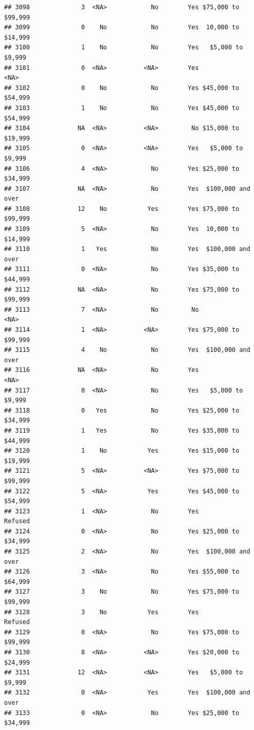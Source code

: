\documentclass[man]{apa6}
\begin{document}
\begin{verbatim}
## 3098              3  <NA>            No        Yes $75,000 to $99,999
## 3099              0    No            No        Yes  10,000 to $14,999
## 3100              1    No            No        Yes   $5,000 to $9,999
## 3101              0  <NA>          <NA>        Yes               <NA>
## 3102              0    No            No        Yes $45,000 to $54,999
## 3103              1    No            No        Yes $45,000 to $54,999
## 3104             NA  <NA>          <NA>         No $15,000 to $19,999
## 3105              0  <NA>          <NA>        Yes   $5,000 to $9,999
## 3106              4  <NA>            No        Yes $25,000 to $34,999
## 3107             NA  <NA>            No        Yes  $100,000 and over
## 3108             12    No           Yes        Yes $75,000 to $99,999
## 3109              5  <NA>            No        Yes  10,000 to $14,999
## 3110              1   Yes            No        Yes  $100,000 and over
## 3111              0  <NA>            No        Yes $35,000 to $44,999
## 3112             NA  <NA>            No        Yes $75,000 to $99,999
## 3113              7  <NA>            No         No               <NA>
## 3114              1  <NA>          <NA>        Yes $75,000 to $99,999
## 3115              4    No            No        Yes  $100,000 and over
## 3116             NA  <NA>            No        Yes               <NA>
## 3117              0  <NA>            No        Yes   $5,000 to $9,999
## 3118              0   Yes            No        Yes $25,000 to $34,999
## 3119              1   Yes            No        Yes $35,000 to $44,999
## 3120              1    No           Yes        Yes $15,000 to $19,999
## 3121              5  <NA>          <NA>        Yes $75,000 to $99,999
## 3122              5  <NA>           Yes        Yes $45,000 to $54,999
## 3123              1  <NA>            No        Yes            Refused
## 3124              0  <NA>            No        Yes $25,000 to $34,999
## 3125              2  <NA>            No        Yes  $100,000 and over
## 3126              3  <NA>            No        Yes $55,000 to $64,999
## 3127              3    No            No        Yes $75,000 to $99,999
## 3128              3    No           Yes        Yes            Refused
## 3129              0  <NA>            No        Yes $75,000 to $99,999
## 3130              8  <NA>          <NA>        Yes $20,000 to $24,999
## 3131             12  <NA>          <NA>        Yes   $5,000 to $9,999
## 3132              0  <NA>           Yes        Yes  $100,000 and over
## 3133              0  <NA>            No        Yes $25,000 to $34,999

\end{verbatim}
\end{document}
